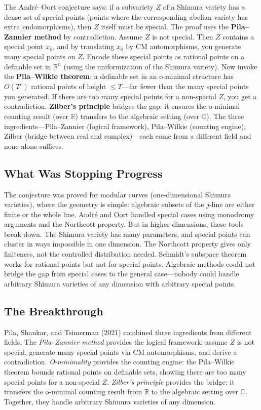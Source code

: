 The André--Oort conjecture says: if a subvariety $Z$ of a Shimura variety has a dense set of special points (points where the corresponding abelian variety has extra endomorphisms), then $Z$ itself must be special. The proof uses the \textbf{Pila--Zannier method} by contradiction. Assume $Z$ is not special. Then $Z$ contains a special point $x_0$, and by translating $x_0$ by CM automorphisms, you generate many special points on $Z$. Encode these special points as rational points on a definable set in $\mathbb{R}^n$ (using the uniformization of the Shimura variety). Now invoke the \textbf{Pila--Wilkie theorem}: a definable set in an o-minimal structure has $O(T^\varepsilon)$ rational points of height $\leq T$---far fewer than the many special points you generated. If there are too many special points for a non-special $Z$, you get a contradiction. \textbf{Zilber's principle} bridges the gap: it ensures the o-minimal counting result (over $\mathbb{R}$) transfers to the algebraic setting (over $\mathbb{C}$). The three ingredients---Pila--Zannier (logical framework), Pila--Wilkie (counting engine), Zilber (bridge between real and complex)---each come from a different field and none alone suffices.

\subsection{What Was Stopping Progress}

The conjecture was proved for modular curves (one-dimensional Shimura varieties), where the geometry is simple: algebraic subsets of the $j$-line are either finite or the whole line. Andr\'{e} and Oort handled special cases using monodromy arguments and the Northcott property. But in higher dimensions, these tools break down. The Shimura variety has many parameters, and special points can cluster in ways impossible in one dimension. The Northcott property gives only finiteness, not the controlled distribution needed. Schmidt's subspace theorem works for rational points but not for special points. Algebraic methods could not bridge the gap from special cases to the general case---nobody could handle arbitrary Shimura varieties of any dimension with arbitrary special points.

\subsection{The Breakthrough}

Pila, Shankar, and Tsimerman (2021) combined three ingredients from different fields. The \emph{Pila--Zannier method} provides the logical framework: assume $Z$ is not special, generate many special points via CM automorphisms, and derive a contradiction. \emph{O-minimality} provides the counting engine: the Pila--Wilkie theorem bounds rational points on definable sets, showing there are too many special points for a non-special $Z$. \emph{Zilber's principle} provides the bridge: it transfers the o-minimal counting result from $\mathbb{R}$ to the algebraic setting over $\mathbb{C}$. Together, they handle arbitrary Shimura varieties of any dimension.

